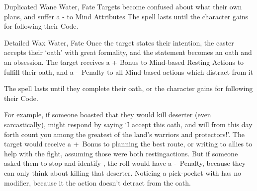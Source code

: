 \ifodd\value{diceNo}

  {Duplicated}%
  {Wane}%
  {Water, Fate}%
  {}%
  {Targets become confused about what their own plans, and suffer a - to Mind Attributes}%
  {The spell lasts until the character gains  for following their Code.}

\else

  {Detailed}%
  {Wax}%
  {Water, Fate}%
  {}%
  {Once the target states their intention, the caster accepts their `oath' with great formality, and the statement becomes an oath and an obsession.
  The target receives a + Bonus to Mind-based Resting Actions to fulfill their oath, and a -~Penalty to all Mind-based actions which distract from it}%
  {The spell lasts until they complete their oath, or the character gains  for following their Code.

  For example, if someone boasted that they would kill  deserter (even sarcastically),  might respond by saying `I accept this oath, and will from this day forth count you among the greatest of the land's warriors and protectors!'.
  The target would receive a +~Bonus to planning the best route, or writing to allies to help with the fight, assuming those were both \glspl{restingaction}.
  But if someone asked them to stop and identify , the roll would have a -~Penalty, because they can only think about killing that deserter.
  Noticing a pick-pocket with  has no modifier, because it the \gls{action} doesn't detract from the oath.}

\fi
{}
